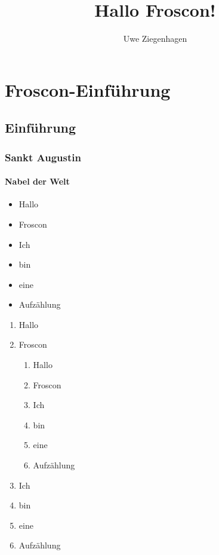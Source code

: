\documentclass[ngerman]{scrreprt}
\title{Hallo Froscon!}
\author{Uwe Ziegenhagen}
\begin{document}
\maketitle

\tableofcontents

\chapter{Froscon-Einführung}

\section{Einführung}

\subsection{Sankt Augustin}

\subsubsection{Nabel der Welt}


\blindtext[1]

\begin{itemize}
	\item Hallo
	\item Froscon
	\item Ich 
	\item bin 
	\item eine 
	\item Aufzählung
\end{itemize}

\begin{enumerate}
	\item Hallo
	\item Froscon
	
\begin{enumerate}
	\item Hallo
	\item Froscon
	\item Ich 
	\item bin 
	\item eine 
	\item Aufzählung
\end{enumerate}	
	
	\item Ich 
	\item bin 
	\item eine 
	\item Aufzählung
\end{enumerate}
\end{document}
